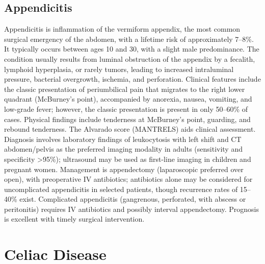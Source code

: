 \subsection{Appendicitis}
\label{sec:Appendicitis}
Appendicitis is inflammation of the vermiform appendix, the most common surgical emergency of the abdomen, with a lifetime risk of approximately 7--8\%. It typically occurs between ages 10 and 30, with a slight male predominance. The condition usually results from luminal obstruction of the appendix by a fecalith, lymphoid hyperplasia, or rarely tumors, leading to increased intraluminal pressure, bacterial overgrowth, ischemia, and perforation. Clinical features include the classic presentation of periumbilical pain that migrates to the right lower quadrant (McBurney's point), accompanied by anorexia, nausea, vomiting, and low-grade fever; however, the classic presentation is present in only 50--60\% of cases. Physical findings include tenderness at McBurney's point, guarding, and rebound tenderness. The Alvarado score (MANTRELS) aids clinical assessment. Diagnosis involves laboratory findings of leukocytosis with left shift and CT abdomen/pelvis as the preferred imaging modality in adults (sensitivity and specificity >95\%); ultrasound may be used as first-line imaging in children and pregnant women. Management is appendectomy (laparoscopic preferred over open), with preoperative IV antibiotics; antibiotics alone may be considered for uncomplicated appendicitis in selected patients, though recurrence rates of 15--40\% exist. Complicated appendicitis (gangrenous, perforated, with abscess or peritonitis) requires IV antibiotics and possibly interval appendectomy. Prognosis is excellent with timely surgical intervention.

\section{Celiac Disease}






